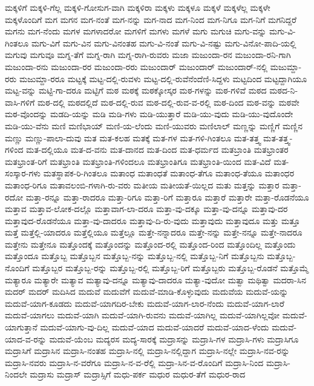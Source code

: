 {ಮಕ್ಕಳಿಗೆ
ಮಕ್ಕಳಿ-ಗೆಲ್ಲ
ಮಕ್ಕಳಿ-ಗೋಸುಗ-ವಾಗಿ
ಮಕ್ಕಳಿರಾ
ಮಕ್ಕಳು
ಮಕ್ಕಳೂ
ಮಕ್ಕಳೆ
ಮಕ್ಕಳೆಲ್ಲ
ಮಕ್ಕಳೇ
ಮಕ್ಕಳೊಂದಿಗೆ
ಮಗ
ಮಗನ
ಮಗ-ನಂತೆ
ಮಗ-ನನ್ನು
ಮಗ-ನಾದ
ಮಗ-ನಿಂದ
ಮಗ-ನಿಗೂ
ಮಗ-ನಿಗೆ
ಮಗನಿದ್ದರೆ
ಮಗನು
ಮಗ-ನೆಂದು
ಮಗಳ
ಮಗಳಾದರೋ
ಮಗಳಿಗೆ
ಮಗಳು
ಮಗಳೆ
ಮಗು
ಮಗುಚಿ
ಮಗು-ವನ್ನು
ಮಗು-ವಿ-ಗಿಂತಲೂ
ಮಗು-ವಿಗೆ
ಮಗು-ವಿನ
ಮಗು-ವಿನಂತಹ
ಮಗು-ವಿ-ನಂತೆ
ಮಗು-ವಿ-ನಷ್ಟು
ಮಗು-ವಿನೋ-ಪಾದಿ-ಯಲ್ಲಿ
ಮಗುವು
ಮಗುವೂ
ಮಗ್ನ-ತೆಗೆ
ಮಗ್ನ-ರಾಗಿ
ಮಗ್ನ-ರಾಗಿ-ರುವರು
ಮಜಾ
ಮಜುಂದಾ-ರನ
ಮಜುಂದಾ-ರನಿ-ಗಾಗಿ
ಮಜುಂದಾ-ರನು
ಮಜುಂದಾ-ರರ
ಮಜುಂದಾ-ರರು
ಮಜುಂದಾರ್
ಮಜುಂದಾರ್
ಮಜುಂದಾರ್-ನಲ್ಲಿ
ಮಜುಮ್ದಾ-ರರು
ಮಜುಮ್ದಾ-ರರೂ
ಮಟ್ಟಕ್ಕೆ
ಮಟ್ಟ-ದಲ್ಲಿ-ರುವಳು
ಮಟ್ಟ-ದಲ್ಲಿ-ರುವೆನೆಂದೆಣಿ-ಸಿದ್ದಳು
ಮಟ್ಟದಿಂದ
ಮಟ್ಟದ್ದಾಗಿಯೂ
ಮಟ್ಟ-ವನ್ನು
ಮಟ್ಟಿ-ಗಾ-ದರೂ
ಮಟ್ಟಿಗೆ
ಮಠ
ಮಠಕ್ಕೆ
ಮಠಕ್ಕೋಸ್ಕರ
ಮಠ-ಗಳನ್ನು
ಮಠ-ಗಳಿವೆ
ಮಠದ
ಮಠದ-ನಿ-ವಾಸಿ-ಗಳಿಗೆ
ಮಠ-ದಲ್ಲಿ
ಮಠದಲ್ಲಿದೆ
ಮಠ-ದಲ್ಲಿ-ರುವ
ಮಠ-ದಲ್ಲಿ-ರುವ-ವ-ರಲ್ಲಿ
ಮಠ-ದಿಂದ
ಮಠ-ವನ್ನು
ಮಠವೇ
ಮಠ-ವೊಂದನ್ನು
ಮಡದಿ-ಯನ್ನು
ಮಡಿ
ಮಡಿ-ಗಳು
ಮಡಿ-ಯುತ್ತಾರೆ
ಮಡಿ-ಯು-ವುದು
ಮಡಿ-ಯು-ವುದೊಂದೇ
ಮಡಿ-ಯು-ವೆನು
ಮಣಿ
ಮಣಿಭಾಯ್
ಮಣಿ-ಯ-ಲೆಂದು
ಮಣಿ-ಯುವರು
ಮಣಿಲಾಲ್
ಮಣ್ಣನ್ನು
ಮಣ್ಣಿಗೆ
ಮಣ್ಣಿನ
ಮಣ್ಣು
ಮಣ್ಣು-ಪಾಲಾ-ದುವು
ಮತ
ಮತ-ಕಲಹ
ಮತಕ್ಕೆ
ಮತ-ಗಳ
ಮತ-ಗಳಿ-ಗಿಂತಲೂ
ಮತ-ತತ್ತ್ವ
ಮತ-ತತ್ತ್ವ-ಗಳಿಂದ
ಮತ-ದಲ್ಲಿಯೂ
ಮತ-ದ-ವನು
ಮತ-ದಾನದ
ಮತ-ದಿಂದ
ಮತ-ಧರ್ಮದ
ಮತಬ್ರಾಂತಿ
ಮತಭ್ರಾಂತರ
ಮತಭ್ರಾಂತ-ರಿಗೆ
ಮತಭ್ರಾಂತಿ
ಮತಭ್ರಾಂತಿ-ಗಳಿಂದಲೂ
ಮತಭ್ರಾಂತಿಗೂ
ಮತಭ್ರಾಂತಿ-ಯಿಂದ
ಮತ-ವಿದೆ
ಮತ-ಸಂಸ್ಕಾರ-ಗಳು
ಮತಸ್ಥಾಪಕ-ರಿ-ಗಿಂತಲೂ
ಮತಾಂಧ
ಮತಾಂಧತೆ
ಮತಾಂಧ-ತೆಗೂ
ಮತಾಂಧ-ತೆಯೂ
ಮತಾಂಧರ
ಮತಾಂಧ-ರಿಗೂ
ಮತಾವಲಂಬಿ-ಗಳಾಗಿ-ರು-ವರು
ಮತೀಯ
ಮತೀಯತೆ-ಯಿಲ್ಲದ
ಮತು
ಮತ್ತನ್ನು
ಮತ್ತಾರ
ಮತ್ತಾ-ರದೋ
ಮತ್ತಾ-ರನ್ನೂ
ಮತ್ತಾ-ರಾದರೂ
ಮತ್ತಾ-ರಿಗೂ
ಮತ್ತಾ-ರಿಗೆ
ಮತ್ತಾರೂ
ಮತ್ತಾರೆ
ಮತ್ತಾರೇ
ಮತ್ತಾ-ರೊಡನೆಯೂ
ಮತ್ತಾವ
ಮತ್ತಾವ-ಲೋಕ-ದಲ್ಲೊ
ಮತ್ತಾವಾಗ-ಲಾ-ದರೂ
ಮತ್ತಾ-ವು-ದಕ್ಕೂ
ಮತ್ತಾ-ವು-ದನ್ನೂ
ಮತ್ತಾವು-ದರ
ಮತ್ತಾವುದ-ರೊಡನೆಯೂ
ಮತ್ತಾ-ವು-ದಾದರೂ
ಮತ್ತಾವು-ದಿ-ರು-ವುದು
ಮತ್ತಾವುದು
ಮತ್ತಾವುದೂ
ಮತ್ತು
ಮತ್ತೂ
ಮತ್ತೆ
ಮತ್ತೆಲ್ಲಿ-ಯಾದರೂ
ಮತ್ತೆಲ್ಲಿಯೂ
ಮತ್ತೆಲ್ಲೂ
ಮತ್ತೇ-ನನ್ನಾದರೂ
ಮತ್ತೇ-ನನ್ನು
ಮತ್ತೇ-ನನ್ನೂ
ಮತ್ತೇ-ನಾದರೂ
ಮತ್ತೇನು
ಮತ್ತೇನೂ
ಮತ್ತೊಂದಕ್ಕೆ
ಮತ್ತೊಂದನ್ನು
ಮತ್ತೊಂದ-ರಲ್ಲಿ
ಮತ್ತೊಂದ-ರಿಂದ
ಮತ್ತೊಂದಿಲ್ಲ
ಮತ್ತೊಂದು
ಮತ್ತೊಂದೂ
ಮತ್ತೊಬ್ಬ
ಮತ್ತೊಬ್ಬನ
ಮತ್ತೊಬ್ಬ-ನನ್ನು
ಮತ್ತೊಬ್ಬ-ನಲ್ಲಿ
ಮತ್ತೊಬ್ಬ-ನಿಗೆ
ಮತ್ತೊಬ್ಬನು
ಮತ್ತೊಬ್ಬ-ನೊಂದಿಗೆ
ಮತ್ತೊಬ್ಬರ
ಮತ್ತೊಬ್ಬ-ರನ್ನು
ಮತ್ತೊಬ್ಬ-ರಲ್ಲಿ
ಮತ್ತೊಬ್ಬ-ರಿಗೆ
ಮತ್ತೊಬ್ಬರು
ಮತ್ತೊಬ್ಬ-ರೊಡನೆ
ಮತ್ತೊಮ್ಮೆ
ಮತ್ಯಾರೂ
ಮತ್ಯಾರೇ
ಮತ್ಯಾವ
ಮತ್ಯಾವು-ದನ್ನೂ
ಮತ್ಯಾವು-ದಾದರೂ
ಮತ್ಯಾ-ವುದೋ
ಮತ್ವಾ
ಮಥಿತ್ವಾ
ಮದರಾ-ಸಿನ
ಮದರ್
ಮದರ್
ಮದಿಸಿದ
ಮದುವೆ
ಮದುವೆಗೆ
ಮದುವೆ-ಮಾಡಿ-ಕೊಳ್ಳುವುದು
ಮದುವೆಯ
ಮದುವೆ-ಯನ್ನು
ಮದುವೆ-ಯಾಗ-ಕೂಡದು
ಮದುವೆ-ಯಾಗದಿರ-ಬೇಕು
ಮದುವೆ-ಯಾಗ-ಲಾರ-ನೆಂದು
ಮದುವೆ-ಯಾಗ-ಲಾರೆ
ಮದುವೆ-ಯಾಗಲು
ಮದುವೆ-ಯಾಗಿ
ಮದುವೆ-ಯಾಗಿ-ರುವನು
ಮದುವೆ-ಯಾಗಿಲ್ಲ
ಮದುವೆ-ಯಾಗಿಲ್ಲವೋ
ಮದುವೆ-ಯಾಗುತ್ತಾನೆ
ಮದುವೆ-ಯಾಗು-ವು-ದಿಲ್ಲ
ಮದುವೆ-ಯಾದ
ಮದುವೆ-ಯಾದರೆ
ಮದುವೆ-ಯಾದ-ಳೆಂದು
ಮದುವೆ-ಯಾದ-ವ-ರನ್ನು
ಮದುವೆ-ಯೆಂಬ
ಮದ್ಯರಸ
ಮದ್ಯ-ಸಾರಕ್ಕೆ
ಮದ್ರಾಸನ್ನು
ಮದ್ರಾಸಿ-ಗಳ
ಮದ್ರಾಸಿ-ಗಳು
ಮದ್ರಾಸಿಗೂ
ಮದ್ರಾಸಿಗೆ
ಮದ್ರಾಸಿನ
ಮದ್ರಾಸಿ-ನಂತಹ
ಮದ್ರಾಸಿ-ನಲ್ಲಿ
ಮದ್ರಾಸಿ-ನಲ್ಲಿದ್ದಾಗ
ಮದ್ರಾಸಿ-ನಲ್ಲೇ
ಮದ್ರಾಸಿ-ನವ-ರನ್ನು
ಮದ್ರಾಸಿ-ನವರು
ಮದ್ರಾಸಿ-ನ-ವರೆಗೂ
ಮದ್ರಾಸಿ-ನ-ವ-ರೆಲ್ಲಿ
ಮದ್ರಾ-ಸಿನ-ವ-ರೊಂದಿಗೆ
ಮದ್ರಾಸಿ-ನಿಂದ
ಮದ್ರಾಸಿ-ನಿಂದಲೇ
ಮದ್ರಾಸು
ಮದ್ರಾಸ್
ಮದ್ರಾಸ್ಸಿಗೆ
ಮಧು-ಪರ್ಕ
ಮಧುರ
ಮಧುರ-ತೆಗೆ
ಮಧುರ-ರಾದ
}
